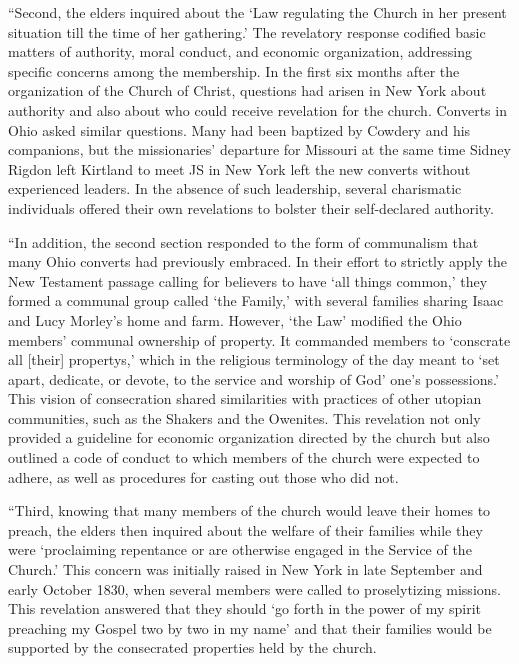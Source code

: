 				``Second, the elders inquired about the `Law regulating the Church in her present situation till the time of her gathering.' The revelatory response codified basic matters of authority, moral conduct, and economic organization, addressing specific concerns among the membership. In the first six months after the organization of the Church of Christ, questions had arisen in New York about authority and also about who could receive revelation for the church. Converts in Ohio asked similar questions. Many had been baptized by Cowdery and his companions, but the missionaries' departure for Missouri at the same time Sidney Rigdon left Kirtland to meet JS in New York left the new converts without experienced leaders. In the absence of such leadership, several charismatic individuals offered their own revelations to bolster their self-declared authority.

				``In addition, the second section responded to the form of communalism that many Ohio converts had previously embraced. In their effort to strictly apply the New Testament passage calling for believers to have `all things common,' they formed a communal group called `the Family,' with several families sharing Isaac and Lucy Morley's home and farm. However, `the Law' modified the Ohio members' communal ownership of property. It commanded members to `conscrate all [their] propertys,' which in the religious terminology of the day meant to `set apart, dedicate, or devote, to the service and worship of God' one's possessions.' This vision of consecration shared similarities with practices of other utopian communities, such as the Shakers and the Owenites. This revelation not only provided a guideline for economic organization directed by the church but also outlined a code of conduct to which members of the church were expected to adhere, as well as procedures for casting out those who did not.

				``Third, knowing that many members of the church would leave their homes to preach, the elders then inquired about the welfare of their families while they were `proclaiming repentance or are otherwise engaged in the Service of the Church.' This concern was initially raised in New York in late September and early October 1830, when several members were called to proselytizing missions. This revelation answered that they should `go forth in the power of my spirit preaching my Gospel two by two in my name' and that their families would be supported by the consecrated properties held by the church.

